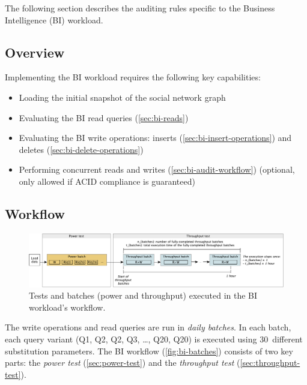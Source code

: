The following section describes the auditing rules specific to the Business Intelligence (BI) workload.

\subsection{Overview}
\label{sec:bi-audit-overview}

Implementing the BI workload requires the following key capabilities:

\begin{itemize}
    \item Loading the initial snapshot of the social network graph
    \item Evaluating the BI read queries (\autoref{sec:bi-reads})
    \item Evaluating the BI write operations: inserts (\autoref{sec:bi-insert-operations}) and deletes (\autoref{sec:bi-delete-operations})
    \item Performing concurrent reads and writes (\autoref{sec:bi-audit-workflow}) (optional, only allowed if ACID compliance is guaranteed)
\end{itemize}

\subsection{Workflow}
\label{sec:bi-audit-workflow}

\begin{figure}[htbp]
    \centering
    \includegraphics[scale=\yedscale]{figures/bi-batches.pdf}
    \caption{Tests and batches (power and throughput) executed in the BI workload's workflow.}
    \label{fig:bi-batches}
\end{figure}

The write operations and read queries are run in \emph{daily batches}.
In each batch, each query variant
(Q1, Q2\variantA, Q2\variantB, Q3, \ldots, Q20\variantA, Q20\variantB)
is executed using 30~different substitution parameters.
The BI workflow (\autoref{fig:bi-batches}) consists of two key parts:
the \emph{power test} (\autoref{sec:power-test}) and
the \emph{throughput test} (\autoref{sec:throughput-test}).

